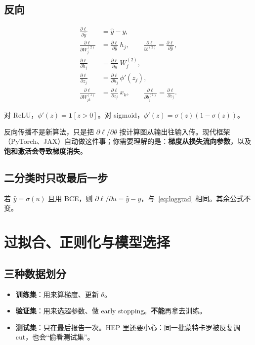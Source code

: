 \documentclass[11pt,a4paper]{article}
\theoremstyle{definition}
\theoremstyle{plain}
\theoremstyle{remark}
\newcommand{\ind}{\mathbf{1}}
\newcommand{\sigm}{\sigma}
\begin{document}
\subsection{反向}

\begin{align}
  \frac{\partial\ell}{\partial\hat y}&=\hat y-y,\\
  \frac{\partial\ell}{\partial W^{(2)}_j}&=\frac{\partial\ell}{\partial\hat y}\,h_j,\qquad
  \frac{\partial\ell}{\partial b^{(2)}}=\frac{\partial\ell}{\partial\hat y},\\
  \frac{\partial\ell}{\partial h_j}&=\frac{\partial\ell}{\partial\hat y}\,W^{(2)}_j,\\
  \frac{\partial\ell}{\partial z_j}&=\frac{\partial\ell}{\partial h_j}\,\phi'(z_j),\\
  \frac{\partial\ell}{\partial W^{(1)}_{jk}}&=\frac{\partial\ell}{\partial z_j}\,x_k,\qquad
  \frac{\partial\ell}{\partial b^{(1)}_j}=\frac{\partial\ell}{\partial z_j}.
\end{align}

对 ReLU，$\phi'(z)=\ind[z>0]$。对 sigmoid，$\phi'(z)=\sigm(z)(1-\sigm(z))$。

\begin{keybox}
反向传播不是新算法，只是把 $\partial\ell/\partial\theta$ 按计算图从输出往输入传。现代框架（PyTorch、JAX）自动做这件事；你需要理解的是：\textbf{梯度从损失流向参数}，以及\textbf{饱和激活会导致梯度消失}。
\end{keybox}

\subsection{二分类时只改最后一步}

若 $\hat y=\sigm(u)$ 且用 BCE，则 $\partial\ell/\partial u=\hat y-y$，与~\eqref{eq:loggrad} 相同。其余公式不变。

\section{过拟合、正则化与模型选择}
\label{sec:overfit}

\subsection{三种数据划分}

\begin{itemize}[leftmargin=1.4em]
  \item \textbf{训练集}：用来算梯度、更新 $\theta$。
  \item \textbf{验证集}：用来选超参数、做 early stopping。\textbf{不能}再拿去训练。
  \item \textbf{测试集}：只在最后报告一次。HEP 里还要小心：同一批蒙特卡罗被反复调 cut，也会``偷看测试集''。
\end{itemize}
\end{document}
